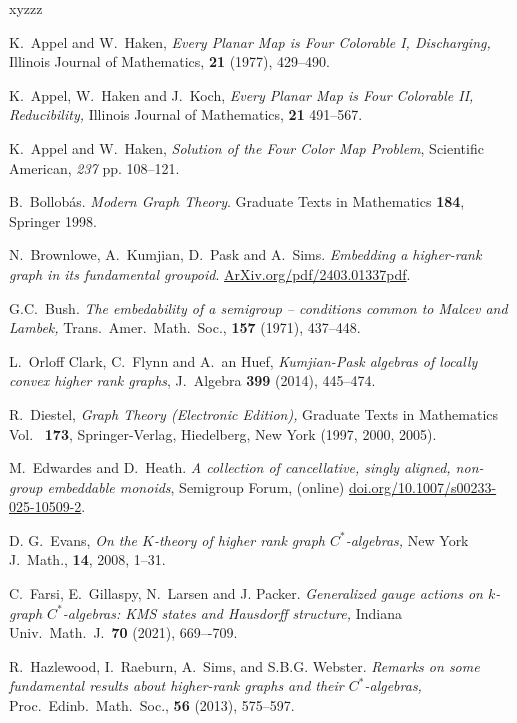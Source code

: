 \documentclass[12pt]{amsart}
\theoremstyle{definition}
\theoremstyle{remark}
\numberwithin{equation}{section}
\begin{document}
\begin{thebibliography}{xyzzz}

 K.\ Appel and W.\ Haken, \emph{Every Planar Map is Four Colorable I, Discharging,} Illinois Journal of Mathematics, \textbf{21} (1977),  429--490.

 K.\ Appel, W.\ Haken and J.\  Koch, \emph{Every Planar Map is Four Colorable II, Reducibility,} Illinois Journal of Mathematics, \textbf{21} 491--567.

 K.\ Appel and W.\ Haken,  \emph{Solution of the Four Color Map Problem}, Scientific American, \emph{237} pp. 108--121.



 B.\ Bollob\'as.
\newblock \emph{Modern Graph Theory}. Graduate Texts in Mathematics \textbf{184}, Springer 1998. 



 N.\ Brownlowe, A.\ Kumjian, D.\ Pask and A.\ Sims. \emph{Embedding a higher-rank graph in its fundamental groupoid}. \href{ArXiv.org/pdf/2403.01337pdf}{ArXiv.org/pdf/2403.01337pdf}.

 G.C.\ Bush.
\newblock \emph{The embedability of a semigroup -- conditions common to Malcev and Lambek,}
\newblock Trans.\ Amer.\ Math.\ Soc., \textbf{157} (1971), 437--448.

 L.\ Orloff Clark,  C.\ Flynn and A.\ an Huef, \emph{Kumjian-Pask algebras of locally convex higher rank graphs}, J.\ Algebra \textbf{399} (2014), 445--474.

 R.\ Diestel, \emph{Graph Theory (Electronic Edition),} Graduate Texts in Mathematics Vol.\ \textbf{ 173},
Springer-Verlag,  Hiedelberg, New York (1997, 2000, 2005).

 M.\ Edwardes and D.\ Heath. \emph{A collection of cancellative, singly aligned, non-group embeddable monoids}, Semigroup Forum, (online) \href{doi.org/10.1007/s00233-025-10509-2}{doi.org/10.1007/s00233-025-10509-2}.

 D. G.\ Evans, {\em On the $K$-theory of higher
 rank graph $C^*$-algebras,} New York J.\ Math., \textbf{14}, 2008, 1--31.


 C.\ Farsi, E.\ Gillaspy, N.\ Larsen and J. Packer. \emph{Generalized gauge actions on $k$-graph $C^*$-algebras: KMS states and Hausdorff structure,} Indiana Univ.\ Math.\ J.\ \textbf{70} (2021),  669–-709.


\newblock R.~Hazlewood, I.~Raeburn, A.~Sims, and S.B.G. Webster.
\newblock \emph{Remarks on some fundamental results about higher-rank graphs and their {$C^*$}-algebras,}
\newblock Proc.\ Edinb.\ Math.\ Soc., \textbf{56} (2013), 575--597.


\end{thebibliography}
\end{document}
